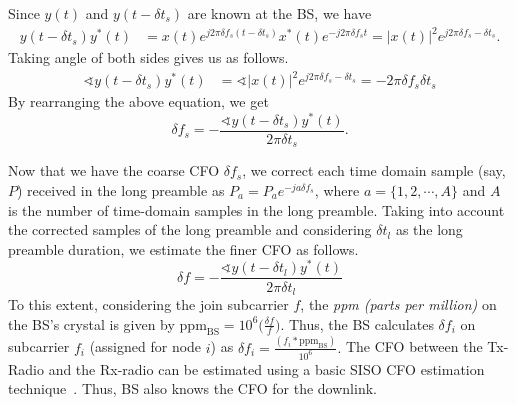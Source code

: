 Since $y(t)$ and $y(t-\delta t_s)$ are known at the BS, we have
\begin{align*}
y(t-\delta t_s) y^*(t)  & = x(t) e^{j2\pi \delta f_s (t-\delta t_s)}       x^*(t) e^{-j2\pi  \delta f_s t}
                           = |x(t)|^2  e^{j 2\pi  \delta f_s -\delta t_s }.
\end{align*}
Taking angle of both sides gives us as follows.
\begin{align*}
\sphericalangle  y(t-\delta t_s) y^*(t)   &=  \sphericalangle     |x(t)|^2  e^{j 2\pi  \delta f_s -\delta t_s } =      - 2\pi  \delta f_s \delta t_s
\end{align*}
By rearranging the above equation, we get
$$\delta f_s   =  - \frac{\sphericalangle  y(t-\delta t_s) y^*(t) }{2\pi\delta t_s}.$$

Now that we have the coarse CFO $\delta f_s$, we correct each time domain sample (say, $P$) received in the long preamble as $ P_a = P_a e^{-ja \delta f_s}$, where $a = \{1, 2, \cdots, A\}$ and $A$ is the number of time-domain samples in the long preamble. Taking into account the corrected samples of the long preamble and considering $\delta t_l$ as the long preamble duration, we estimate the finer CFO as follows. 
\begin{equation} 
\delta f  =  - \frac{\sphericalangle  y(t-\delta t_l) y^*(t) }{2\pi\delta t_l} \label{eqn:finer_cfo}
\end{equation}
To this extent, considering the join subcarrier $f$, the {\slshape ppm (parts per million)} on the BS's crystal is given by $ \text{ppm}_\text{BS} = 10^6  \big(\frac{\delta f}{f}\big) $. Thus, the BS calculates $ \delta f_i$ on subcarrier $f_i$ (assigned for node $i$) as 
$\delta f_i =  \frac{(f_i * \text{ppm}_\text{BS})}{10^6}.$ The CFO between the Tx-Radio and the Rx-radio can be estimated using a basic SISO CFO estimation technique~\cite{yao2005blind}. Thus, BS also knows the CFO for the downlink.


